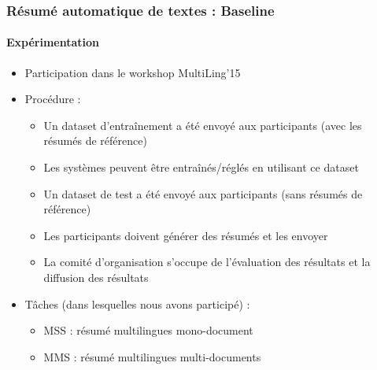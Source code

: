 \documentclass[xcolor=table]{beamer}
\begin{document}
\begin{frame}
\frametitle{Résumé automatique de textes : Baseline}
\framesubtitle{Expérimentation}
	
	\begin{itemize}
		\item Participation dans le workshop MultiLing'15 \cite{15-aries-al}
		\item Procédure :
		\begin{itemize}
			\item Un dataset d'entraînement a été envoyé aux participants (avec les résumés de référence)
			\item Les systèmes peuvent être entraînés/réglés en utilisant ce dataset
			\item Un dataset de test a été envoyé aux participants (sans résumés de référence)
			\item Les participants doivent générer des résumés et les envoyer
			\item La comité d'organisation s'occupe de l'évaluation des résultats et la diffusion des résultats
		\end{itemize}
		\item Tâches (dans lesquelles nous avons participé) :
		\begin{itemize}
			\item MSS : résumé multilingues mono-document
			\item MMS : résumé multilingues multi-documents
		\end{itemize}
	\end{itemize}
	
\end{frame}
\end{document}

